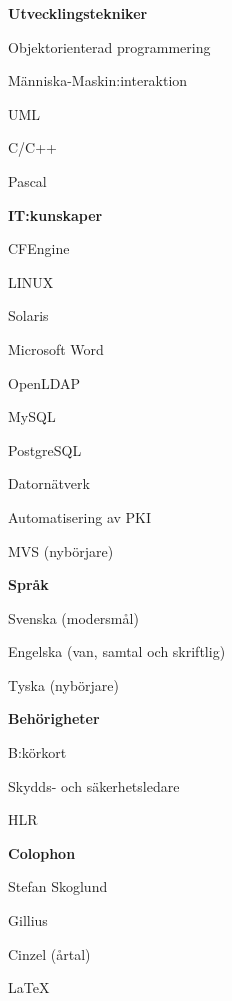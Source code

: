 \documentclass[a4paper,swedish,10pt]{article}
\begin{document}
\begin{minipage}[t]{0.27\textwidth}
  \raggedleft%
  \textbf{Utvecklingstekniker}
  \begin{description}[nosep]
    \raggedleft\setlength\itemsep{0.1ex}\small%
  \item Objektorienterad programmering
  \item Människa-Maskin:interaktion
  \item UML
  \item C/C++
  \item Pascal
  \end{description}
  \vspace{0.5cm}
  \textbf{IT:kunskaper}
  \begin{description}[nosep]
    \raggedleft\setlength\itemsep{0.1ex}\small%
  \item CFEngine
  \item LINUX
  \item Solaris
  \item Microsoft Word
  \item OpenLDAP
  \item MySQL
  \item PostgreSQL
  \item Datornätverk
  \item Automatisering av PKI
  \item MVS (nybörjare)
  \end{description}
  \vspace{0.5cm}
  \textbf{Språk}
  \begin{description}[nosep,itemsep=0.1ex]
    \raggedleft\small%
  \item Svenska (modersmål)
  \item Engelska (van, samtal och skriftlig)
  \item Tyska (nybörjare)
  \end{description}
  \vspace{0.5cm}
  \textbf{Behörigheter}
  \begin{description}[nosep]
    \raggedleft\setlength\itemsep{0.1ex}\small%
  \item B:körkort
  \item Skydds- och säkerhetsledare
  \item HLR
  \end{description}
  \vspace{5cm}
  \textbf{Colophon}
  \begin{description}[nosep]
    \raggedleft\setlength\itemsep{0.1ex}\small%
  \item Stefan Skoglund {}
  \item Gillius
  \item Cinzel (årtal)
  \item \LaTeX%
  \end{description}
\end{minipage}
\end{document}
